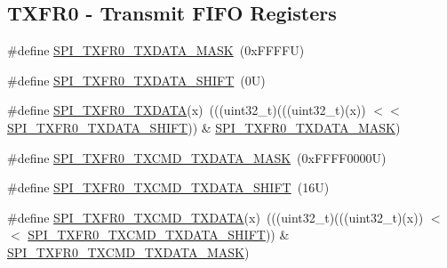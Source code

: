 \subsection*{T\+X\+F\+R0 -\/ Transmit F\+I\+FO Registers}
\begin{DoxyCompactItemize}
\item 
\#define \mbox{\hyperlink{group___s_p_i___register___masks_ga9a231481c0385058731013344776a9f1}{S\+P\+I\+\_\+\+T\+X\+F\+R0\+\_\+\+T\+X\+D\+A\+T\+A\+\_\+\+M\+A\+SK}}~(0x\+F\+F\+F\+F\+U)
\item 
\#define \mbox{\hyperlink{group___s_p_i___register___masks_ga8f072c39e4ee2cddff2444298fc92be0}{S\+P\+I\+\_\+\+T\+X\+F\+R0\+\_\+\+T\+X\+D\+A\+T\+A\+\_\+\+S\+H\+I\+FT}}~(0\+U)
\item 
\#define \mbox{\hyperlink{group___s_p_i___register___masks_gae09e375e6cc7f496ac90d900888f7d9c}{S\+P\+I\+\_\+\+T\+X\+F\+R0\+\_\+\+T\+X\+D\+A\+TA}}(x)~(((uint32\+\_\+t)(((uint32\+\_\+t)(x)) $<$$<$ \mbox{\hyperlink{group___s_p_i___register___masks_ga8f072c39e4ee2cddff2444298fc92be0}{S\+P\+I\+\_\+\+T\+X\+F\+R0\+\_\+\+T\+X\+D\+A\+T\+A\+\_\+\+S\+H\+I\+FT}})) \& \mbox{\hyperlink{group___s_p_i___register___masks_ga9a231481c0385058731013344776a9f1}{S\+P\+I\+\_\+\+T\+X\+F\+R0\+\_\+\+T\+X\+D\+A\+T\+A\+\_\+\+M\+A\+SK}})
\item 
\#define \mbox{\hyperlink{group___s_p_i___register___masks_ga2d7e46a45e284b2a837f0dfa4103c9cc}{S\+P\+I\+\_\+\+T\+X\+F\+R0\+\_\+\+T\+X\+C\+M\+D\+\_\+\+T\+X\+D\+A\+T\+A\+\_\+\+M\+A\+SK}}~(0x\+F\+F\+F\+F0000\+U)
\item 
\#define \mbox{\hyperlink{group___s_p_i___register___masks_gad5b1e75e9410e41d3c81384798040284}{S\+P\+I\+\_\+\+T\+X\+F\+R0\+\_\+\+T\+X\+C\+M\+D\+\_\+\+T\+X\+D\+A\+T\+A\+\_\+\+S\+H\+I\+FT}}~(16\+U)
\item 
\#define \mbox{\hyperlink{group___s_p_i___register___masks_ga7534e83201b7ea6c7beb55f2ed16ecaa}{S\+P\+I\+\_\+\+T\+X\+F\+R0\+\_\+\+T\+X\+C\+M\+D\+\_\+\+T\+X\+D\+A\+TA}}(x)~(((uint32\+\_\+t)(((uint32\+\_\+t)(x)) $<$$<$ \mbox{\hyperlink{group___s_p_i___register___masks_gad5b1e75e9410e41d3c81384798040284}{S\+P\+I\+\_\+\+T\+X\+F\+R0\+\_\+\+T\+X\+C\+M\+D\+\_\+\+T\+X\+D\+A\+T\+A\+\_\+\+S\+H\+I\+FT}})) \& \mbox{\hyperlink{group___s_p_i___register___masks_ga2d7e46a45e284b2a837f0dfa4103c9cc}{S\+P\+I\+\_\+\+T\+X\+F\+R0\+\_\+\+T\+X\+C\+M\+D\+\_\+\+T\+X\+D\+A\+T\+A\+\_\+\+M\+A\+SK}})
\end{DoxyCompactItemize}
